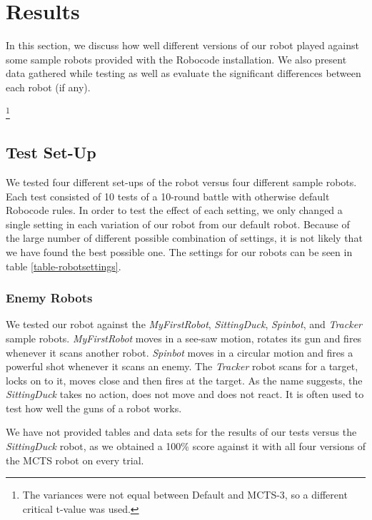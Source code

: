 \section{Results}
\label{05}
In this section, we discuss how well different versions of our robot played against some sample robots provided with the Robocode installation. We also present data gathered while testing as well as evaluate the significant differences between each robot (if any).

\footnote{The variances were not equal between Default and MCTS-3, so a different critical t-value was used.}

\subsection{Test Set-Up}
We tested four different set-ups of the robot versus four different sample robots. Each test consisted of 10 tests of a 10-round battle with otherwise default Robocode rules. In order to test the effect of each setting, we only changed a single setting in each variation of our robot from our default robot. Because of the large number of different possible combination of settings, it is not likely that we have found the best possible one. The settings for our robots can be seen in table \ref{table-robotsettings}.

\subsubsection{Enemy Robots} 
We tested our robot against the \textit{MyFirstRobot}, \textit{SittingDuck}, \textit{Spinbot}, and \textit{Tracker} sample robots. \textit{MyFirstRobot} moves in a see-saw motion, rotates its gun and fires whenever it scans another robot. \textit{Spinbot} moves in a circular motion and fires a powerful shot whenever it scans an enemy. The \textit{Tracker} robot scans for a target, locks on to it, moves close and then fires at the target. As the name suggests, the \textit{SittingDuck} takes no action, does not move and does not react. It is often used to test how well the guns of a robot works.

We have not provided tables and data sets for the results of our tests versus the \textit{SittingDuck} robot, as we obtained a 100\% score against it with all four versions of the MCTS robot on every trial. 

